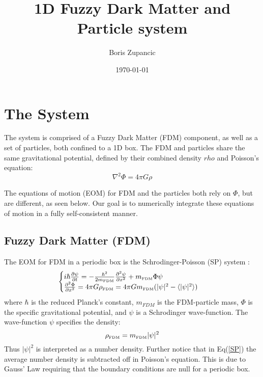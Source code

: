 \documentclass{article}
\title{1D Fuzzy Dark Matter and Particle system}
\author{Boris Zupancic}
\date{\today}
\newcommand{\pd}{\partial}
\begin{document}
\maketitle

\section{The System}

The system is comprised of a Fuzzy Dark Matter (FDM) component, as well as a set of particles, both confined to a 1D box. The FDM and particles share the same gravitational potential, defined by their combined density $rho$ and Poisson's equation: 
\begin{equation*}
\nabla^2 \Phi = 4\pi G \rho    
\end{equation*}

The equations of motion (EOM) for FDM and the particles both rely on $\Phi$, but are different, as seen below. Our goal is to numerically integrate these equations of motion in a fully self-consistent manner.

\subsection{Fuzzy Dark Matter (FDM)}
The EOM for FDM in a periodic box is the Schrodinger-Poisson (SP) system :
\begin{equation}
    \begin{cases}
    i\hbar \frac{\pd \psi}{\pd t} = -\frac{\hbar^2}{2 m_\text{\tiny{FDM}}} \frac{\pd^2 \psi}{\pd x^2} + m_\text{\tiny{FDM}} \Phi \psi 
    \\
    \frac{\pd^2 \Phi}{\pd x^2} = 4\pi G \rho_\text{\tiny{FDM}}= 4\pi G m_\text{\tiny{FDM}} (|\psi|^2 - \langle |\psi|^2 \rangle)
    \end{cases}
    \label{SP}
\end{equation}
where $\hbar$ is the reduced Planck's constant, $m_{FDM}$ is the FDM-particle mass, $\Phi$ is the specific gravitational potential, and $\psi$ is a Schrodinger wave-function. The wave-function $\psi$ specifies the density:
$$\rho_\text{\tiny{FDM}} = m_\text{\tiny{FDM}}|\psi|^2$$
Thus $|\psi|^2$ is interpreted as a number density. Further notice that in Eq(\ref{SP}) the average number density is subtracted off in Poisson's equation. This is due to Gauss' Law requiring that the boundary conditions are null for a periodic box. 
\end{document}

